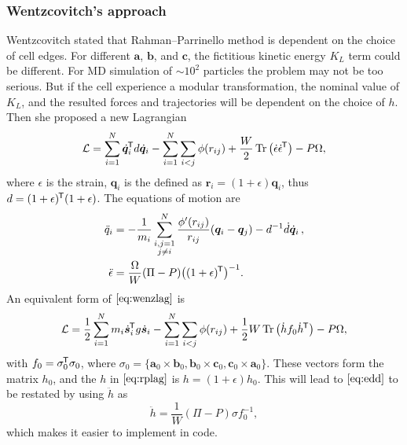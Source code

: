 \subsubsection{Wentzcovitch's approach}

Wentzcovitch stated that Rahman--Parrinello method is dependent on
the choice of cell edges.\cite{Wentzcovitch:1991ka}
For different $\bm{a}$, $\bm{b}$, and
$\bm{c}$, the fictitious kinetic energy $K_L$ term could be different.
For MD simulation of $\sim 10^2$ particles the problem may
not be too serious. But if the cell experience a modular transformation,
the nominal value of $K_L$, and the resulted forces and trajectories
will be dependent on the choice of $h$. Then she proposed a new
Lagrangian
\begin{equation}\label{eq:wenzlag}
	\mathcal{L} = \sum_{i=1}^{N} \dot{ \bm{q} }_i^{\mkern-1.5mu\mathsf{T}} d \dot{ \bm{q} }_i
	- \sum_{i=1}^{N} \sum_{i<j} \phi(r_{ij}) + \frac{ W }{ 2 }
	\operatorname{Tr} \big( \dot{ \epsilon } \dot{ \epsilon }^{\mkern-1.5mu\mathsf{T}} \big) - P \Omega,
\end{equation}
where $\epsilon$ is the strain, $\bm{q}_i$ is the defined as
$\bm{r}_i = (1+\epsilon) \bm{q}_i$, thus $d = (1 + \epsilon)^{\mkern-1.5mu\mathsf{T}}
	(1+\epsilon)$.
The equations of motion are
\begin{align}
	\ddot{q}_i      & = - \frac{ 1 }{ m_i } \sum_{\substack{i, j=1 \\j\neq i}}^{N}
	\frac{ \phi'(r_{ij}) }{ r_{ij} }(\bm{q}_i - \bm{q}_j) - d^{-1} \dot{ d }
	\dot{ \bm{q} }_i \thinspace,\\
	\ddot{\epsilon} & = \frac{ \Omega }{ W } (\Pi - P)
	\big((1+\epsilon)^{\mkern-1.5mu\mathsf{T}}\big)^{-1}.\label{eq:edd}
\end{align}
An equivalent form of $\eqref{eq:wenzlag}$ is
\begin{equation}
	\mathcal{L} = \frac{ 1 }{ 2 } \sum_{i=1}^{N} m_i \dot{ \bm{s} }_i ^{\mkern-1.5mu\mathsf{T}}
	g \dot{ \bm{s} }_i - \sum_{i=1}^{N} \sum_{i<j} \phi (r_{ij}) +
	\frac{ 1 }{ 2 } W \operatorname{Tr} \big(\dot{h} f_0 \dot{h}^{\mkern-1.5mu\mathsf{T}} \big) - P \Omega,
\end{equation}
with $f_0 = \sigma_0 ^{\mkern-1.5mu\mathsf{T}} \sigma_0$, where $\sigma_0 = \{
	\bm{a}_0 \times \bm{b}_0, \bm{b}_0 \times \bm{c}_0,
	\bm{c}_0 \times \bm{a}_0 \}$. These vectors form the matrix $h_0$,
and the $h$ in $\eqref{eq:rplag}$ is $h = (1+\epsilon) h_0$.
This will lead to $\eqref{eq:edd}$ to be restated by using $\ddot{h}$
as
\begin{equation}\label{eq:wenzhdd}
	\ddot{h} = \frac{ 1 }{ W } (\Pi - P) \sigma f_0^{-1},
\end{equation}
which makes it easier to implement in code.

